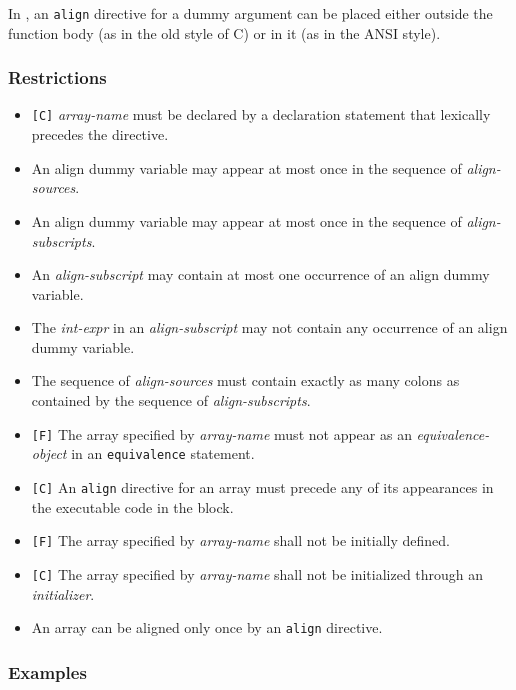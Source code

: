 In {\XMPC}, an {\tt align} directive for a dummy argument can be placed
either outside the function body (as in the old style of C) or in it (as
in the ANSI style).

\subsubsection*{Restrictions}

\begin{itemize}
 \item \verb![C]! {\it array-name} must be declared by a declaration
       statement that lexically precedes the directive.
\item An align dummy variable may appear at most once in
      the sequence of {\it align-sources}.
\item An align dummy variable may appear at most once in the sequence of
      {\it align-subscripts}.
\item An {\it align-subscript} may contain at most one occurrence of an
      align dummy variable.
\item The {\it int-expr} in an {\it align-subscript} may not contain any
      occurrence of an align dummy variable.
\item The sequence of {\it align-sources} must contain exactly as many
      colons as contained by the sequence of {\it align-subscripts}.
\item \verb![F]! The array specified by {\it array-name} must not appear
      as an {\it equivalence-object} in an {\tt equivalence} statement.
\item \verb![C]! An {\tt align} directive for an array must
      precede any of its appearances in the executable code in the block.
\item \verb![F]! The array specified by {\it array-name} shall not be
      initially defined.
\item \verb![C]! The array specified by {\it array-name} shall not be
      initialized through an {\it initializer}.
\item An array can be aligned only once by an {\tt align} directive.
\end{itemize}

\subsubsection*{Examples}

